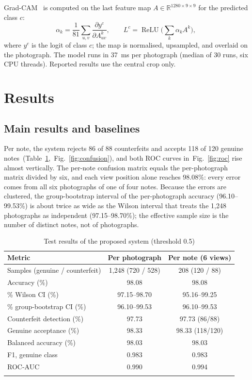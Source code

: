 \documentclass[pdflatex,sn-mathphys-num]{sn-jnl}
\begin{document}
Grad-CAM~\cite{selvaraju2017gradcam} is computed on the last feature map
$A\in\mathbb{R}^{1280\times9\times9}$ for the predicted class $c$:
\begin{equation}
\alpha_k = \frac{1}{81}\sum_{u,v}\frac{\partial y^{c}}{\partial A^{k}_{uv}},\qquad
L^{c} = \operatorname{ReLU}\!\Big(\sum_{k}\alpha_k A^{k}\Big),
\label{eq:gradcam}
\end{equation}
where $y^c$ is the logit of class $c$; the map is normalised, upsampled, and overlaid on
the photograph. The model runs in 37~ms per photograph (median of 30 runs, six CPU
threads). Reported results use the central crop only.

\section{Results}\label{sec:results}

\subsection{Main results and baselines}\label{sec:main}

Per note, the system rejects 86 of 88 counterfeits and accepts 118 of 120 genuine notes~(Table~\ref{tab:main},~Fig.~\ref{fig:confusion}), and both ROC curves in~Fig.~\ref{fig:roc} rise almost vertically. The per-note confusion matrix equals the
per-photograph matrix divided by six, and each view position alone reaches 98.08\%:
every error comes from all six photographs of one of four notes. Because the errors are
clustered, the group-bootstrap interval of the per-photograph accuracy (96.10--99.53\%)
is about twice as wide as the Wilson interval that treats the 1{,}248 photographs as
independent (97.15--98.70\%); the effective sample size is the number of distinct notes,
not of photographs.

\begin{table}[!htbp]
\caption{Test results of the proposed system (threshold 0.5)}\label{tab:main}
\begin{tabular*}{\textwidth}{@{\extracolsep\fill}lcc}
\toprule
Metric & Per photograph & Per note (6 views) \\
\midrule
Samples (genuine / counterfeit) & 1{,}248 (720 / 528) & 208 (120 / 88) \\
Accuracy (\%) & 98.08 & 98.08 \\
\quad 95\% Wilson CI (\%) & 97.15--98.70 & 95.16--99.25 \\
\quad 95\% group-bootstrap CI (\%) & 96.10--99.53 & 96.10--99.53 \\
Counterfeit detection (\%) & 97.73 & 97.73 (86/88) \\
Genuine acceptance (\%) & 98.33 & 98.33 (118/120) \\
Balanced accuracy (\%) & 98.03 & 98.03 \\
F1, genuine class & 0.983 & 0.983 \\
ROC-AUC & 0.990 & 0.994 \\
\botrule
\end{tabular*}
\end{table}
\end{document}
